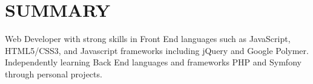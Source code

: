 \documentclass[]{deedy-resume-openfont}
\begin{document}
%
%

%
%



\vspace{5mm}

%
%

\section{SUMMARY}
\begin{flushleft}
Web Developer with strong skills in Front End languages such as JavaScript, HTML5/CSS3, and Javascript frameworks including jQuery and Google Polymer. Independently learning Back End languages and frameworks PHP and Symfony through personal projects. 
\end{flushleft}
\end{document}
